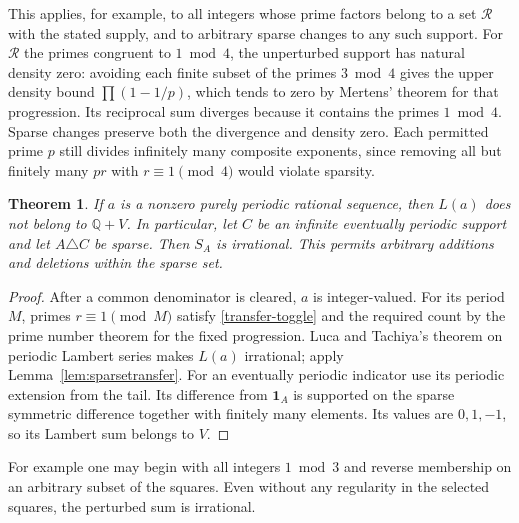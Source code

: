 \documentclass[11pt,letterpaper]{article}
\newtheorem{theorem}{Theorem}[section]
\begin{document}
This applies, for example, to all integers whose prime factors belong
to a set $\mathcal R$ with the stated supply, and to arbitrary sparse
changes to any such support. For $\mathcal R$ the primes congruent
to $1\bmod 4$, the unperturbed support has natural density zero:
avoiding each finite subset of the primes $3\bmod4$ gives the upper
density bound $\prod(1-1/p)$, which tends to zero by Mertens' theorem
for that progression. Its reciprocal sum diverges because it contains
the primes $1\bmod4$. Sparse changes preserve both the divergence
and density zero. Each permitted prime $p$ still divides infinitely
many composite exponents, since removing all but finitely many
$p r$ with $r\equiv1\pmod4$ would violate sparsity.

\begin{theorem}\label{thm:robust-periodic}
If $a$ is a nonzero purely periodic rational sequence, then $L(a)$
does not belong to $\mathbb Q+V$. In particular, let $C$ be an infinite
eventually periodic support and let $A\triangle C$ be sparse. Then
$S_A$ is irrational. This permits arbitrary additions and deletions
within the sparse set.
\end{theorem}
\begin{proof}
After a common denominator is cleared, $a$ is integer-valued. For its
period $M$, primes $r\equiv1\pmod M$ satisfy \eqref{transfer-toggle}
and the required count by the prime number theorem for the fixed
progression. Luca and Tachiya's theorem on periodic Lambert series \cite[Theorem~1.1]{luca}
makes $L(a)$ irrational; apply Lemma~\ref{lem:sparsetransfer}.
For an eventually periodic indicator use its periodic extension from
the tail. Its difference from $\mathbf1_A$ is supported on the sparse
symmetric difference together with finitely many elements. Its values
are $0,1,-1$, so its Lambert sum belongs to $V$.
\end{proof}

For example one may begin with all integers $1\bmod 3$ and reverse
membership on an arbitrary subset of the squares. Even without any
regularity in the selected squares, the perturbed sum is irrational.
\end{document}
